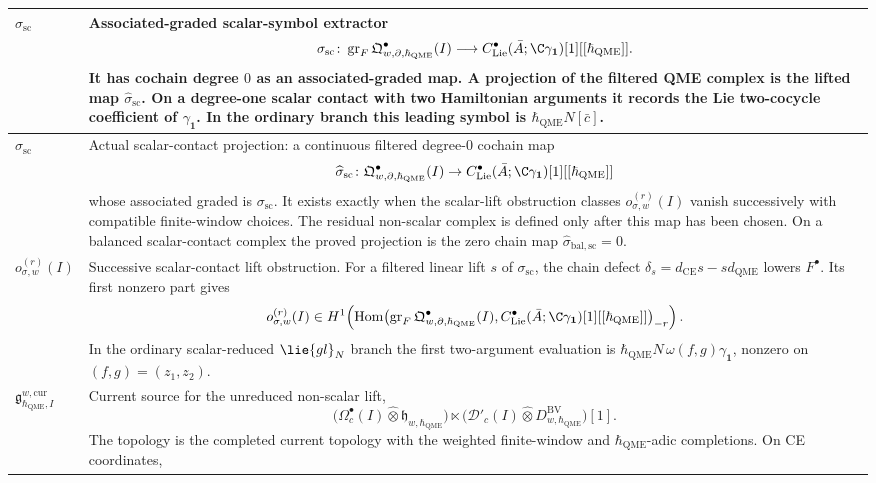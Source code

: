 \begin{longtable}{@{}>{\raggedright\arraybackslash}p{}
  >{\raggedright\arraybackslash}p{}@{}}
\hline
\(\sigma_{\mathrm{sc}}\) &
Associated-graded scalar-symbol extractor
\[
  \sigma_{\mathrm{sc}}\colon
  \operatorname{gr}_F\mathfrak Q^\bullet_{w,\partial,\hbar_{\mathrm{QME}}}(I)
  \longrightarrow
  C^\bullet_{\mathrm{Lie}}(\bar A;\C\gamma_{\mathbf 1})[1][[\hbar_{\mathrm{QME}}]] .
\]
It has cochain degree \(0\) as an associated-graded map.  A projection of
the filtered QME complex is the lifted map
\(\widehat\sigma_{\mathrm{sc}}\).  On a degree-one scalar contact with two
Hamiltonian arguments it records the Lie two-cocycle coefficient of
\(\gamma_{\mathbf 1}\).  In the ordinary branch this leading symbol is
\(\hbar_{\mathrm{QME}}N[\bar c]\).\\
\hline
\(\widehat\sigma_{\mathrm{sc}}\) &
Actual scalar-contact projection: a continuous filtered degree-\(0\)
cochain map
\[
  \widehat\sigma_{\mathrm{sc}}\colon
  \mathfrak Q^\bullet_{w,\partial,\hbar_{\mathrm{QME}}}(I)
  \to
  C^\bullet_{\mathrm{Lie}}(\bar A;\C\gamma_{\mathbf 1})[1][[\hbar_{\mathrm{QME}}]]
\]
whose associated graded is \(\sigma_{\mathrm{sc}}\).  It exists exactly
when the scalar-lift obstruction classes
\(o_{\sigma,w}^{(r)}(I)\) vanish successively with compatible
finite-window choices.  The residual non-scalar complex is defined only
after this map has been chosen.  On a balanced scalar-contact complex
the proved projection is the zero chain map
\(\widehat\sigma_{\mathrm{bal,sc}}=0\).\\
\hline
\(o_{\sigma,w}^{(r)}(I)\) &
Successive scalar-contact lift obstruction.  For a filtered linear lift
\(s\) of \(\sigma_{\mathrm{sc}}\), the chain defect
\(\delta_s=d_{\mathrm{CE}}s-sd_{\mathrm{QME}}\) lowers \(F^\bullet\).
Its first nonzero part gives
\[
  o_{\sigma,w}^{(r)}(I)\in
  H^1\!\left(
    \operatorname{Hom}\bigl(
      \operatorname{gr}_F\mathfrak Q^\bullet_{w,\partial,\hbar_{\mathrm{QME}}}(I),
      C^\bullet_{\mathrm{Lie}}(\bar A;\C\gamma_{\mathbf 1})[1][[\hbar_{\mathrm{QME}}]]
    \bigr)_{-r}
  \right).
\]
In the ordinary scalar-reduced \(\lie{gl}_N\) branch the first
two-argument evaluation is
\(\hbar_{\mathrm{QME}}N\,\omega(f,g)\gamma_{\mathbf 1}\), nonzero on
\((f,g)=(z_1,z_2)\).\\
\hline
\(\mathfrak g^{w,\mathrm{cur}}_{\hbar_{\mathrm{QME}},I}\) &
Current source for the unreduced non-scalar lift,
\[
  \bigl(\Omega^\bullet_c(I)\widehat\otimes\mathfrak h_{w,\hbar_{\mathrm{QME}}}\bigr)
  \ltimes
  \bigl(\mathcal D'_c(I)\widehat\otimes
  D^{\mathrm{BV}}_{w,\hbar_{\mathrm{QME}}}\bigr)[1].
\]
The topology is the completed current topology with the weighted
finite-window and \(\hbar_{\mathrm{QME}}\)-adic completions.  On CE coordinates,

\end{longtable}
